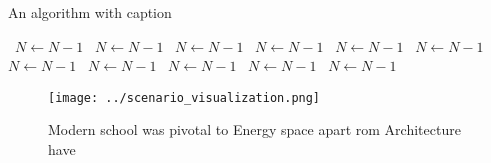 \documentclass[a4paper]{article}
\begin{document}
\begin{algorithm}
\caption{An algorithm with caption}
\begin{algorithmic}
\    \State $N \gets N - 1$
\    \State $N \gets N - 1$
\    \State $N \gets N - 1$
\    \State $N \gets N - 1$
\    \State $N \gets N - 1$
\    \State $N \gets N - 1$
\    \State $N \gets N - 1$
\    \State $N \gets N - 1$
\    \State $N \gets N - 1$
\    \State $N \gets N - 1$
\    \State $N \gets N - 1$
\EndWhile
\end{algorithmic}
\end{algorithm}

\begin{figure}
\centering
\texttt{[image: ../scenario\_visualization.png]}
\caption{Modern school was pivotal to Energy space apart rom Architecture have
}
\end{figure}
 
\end{document}
